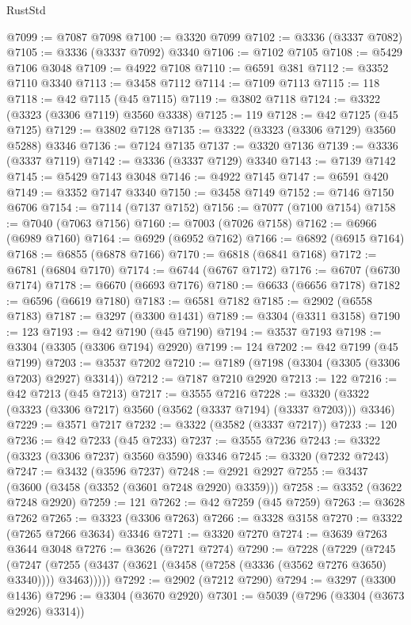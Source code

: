 \begin{lexlean}{RustStd}
\begin{coremodule}
@7099 := @7087 @7098
@7100 := @3320 @7099
@7102 := @3336 (@3337 @7082)
@7105 := @3336 (@3337 @7092) @3340
@7106 := @7102 @7105
@7108 := @5429 @7106 @3048
@7109 := @4922 @7108
@7110 := @6591 @381
@7112 := @3352 @7110 @3340
@7113 := @3458 @7112
@7114 := @7109 @7113
@7115 := 118
@7118 := @42 @7115 (@45 @7115)
@7119 := @3802 @7118
@7124 := @3322 (@3323 (@3306 @7119) @3560 @3338)
@7125 := 119
@7128 := @42 @7125 (@45 @7125)
@7129 := @3802 @7128
@7135 := @3322 (@3323 (@3306 @7129) @3560 @5288) @3346
@7136 := @7124 @7135
@7137 := @3320 @7136
@7139 := @3336 (@3337 @7119)
@7142 := @3336 (@3337 @7129) @3340
@7143 := @7139 @7142
@7145 := @5429 @7143 @3048
@7146 := @4922 @7145
@7147 := @6591 @420
@7149 := @3352 @7147 @3340
@7150 := @3458 @7149
@7152 := @7146 @7150 @6706
@7154 := @7114 (@7137 @7152)
@7156 := @7077 (@7100 @7154)
@7158 := @7040 (@7063 @7156)
@7160 := @7003 (@7026 @7158)
@7162 := @6966 (@6989 @7160)
@7164 := @6929 (@6952 @7162)
@7166 := @6892 (@6915 @7164)
@7168 := @6855 (@6878 @7166)
@7170 := @6818 (@6841 @7168)
@7172 := @6781 (@6804 @7170)
@7174 := @6744 (@6767 @7172)
@7176 := @6707 (@6730 @7174)
@7178 := @6670 (@6693 @7176)
@7180 := @6633 (@6656 @7178)
@7182 := @6596 (@6619 @7180)
@7183 := @6581 @7182
@7185 := @2902 (@6558 @7183)
@7187 := @3297 (@3300 @1431)
@7189 := @3304 (@3311 @3158)
@7190 := 123
@7193 := @42 @7190 (@45 @7190)
@7194 := @3537 @7193
@7198 := @3304 (@3305 (@3306 @7194) @2920)
@7199 := 124
@7202 := @42 @7199 (@45 @7199)
@7203 := @3537 @7202
@7210 := @7189 (@7198 (@3304 (@3305 (@3306 @7203) @2927) @3314))
@7212 := @7187 @7210 @2920
@7213 := 122
@7216 := @42 @7213 (@45 @7213)
@7217 := @3555 @7216
@7228 := @3320 (@3322 (@3323 (@3306 @7217) @3560 (@3562 (@3337 @7194) (@3337 @7203))) @3346)
@7229 := @3571 @7217
@7232 := @3322 (@3582 (@3337 @7217))
@7233 := 120
@7236 := @42 @7233 (@45 @7233)
@7237 := @3555 @7236
@7243 := @3322 (@3323 (@3306 @7237) @3560 @3590) @3346
@7245 := @3320 (@7232 @7243)
@7247 := @3432 (@3596 @7237)
@7248 := @2921 @2927
@7255 := @3437 (@3600 (@3458 (@3352 (@3601 @7248 @2920) @3359)))
@7258 := @3352 (@3622 @7248 @2920)
@7259 := 121
@7262 := @42 @7259 (@45 @7259)
@7263 := @3628 @7262
@7265 := @3323 (@3306 @7263)
@7266 := @3328 @3158
@7270 := @3322 (@7265 @7266 @3634) @3346
@7271 := @3320 @7270
@7274 := @3639 @7263 @3644 @3048
@7276 := @3626 (@7271 @7274)
@7290 := @7228
    (@7229
      (@7245
        (@7247 (@7255 (@3437 (@3621 (@3458 (@7258 (@3336 (@3562 @7276 @3650) @3340)))) @3463)))))
@7292 := @2902 (@7212 @7290)
@7294 := @3297 (@3300 @1436)
@7296 := @3304 (@3670 @2920)
@7301 := @5039 (@7296 (@3304 (@3673 @2926) @3314))

\end{coremodule}
\end{lexlean}
